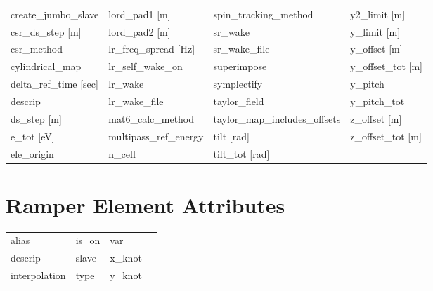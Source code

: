 \begin{tabular}{llll}
create_jumbo_slave               & lord_pad1 [m]                    & spin_tracking_method             & y2_limit [m]                     \\
csr_ds_step [m]                  & lord_pad2 [m]                    & sr_wake                          & y_limit [m]                      \\
csr_method                       & lr_freq_spread [Hz]              & sr_wake_file                     & y_offset [m]                     \\
cylindrical_map                  & lr_self_wake_on                  & superimpose                      & y_offset_tot [m]                 \\
delta_ref_time [sec]             & lr_wake                          & symplectify                      & y_pitch                          \\
descrip                          & lr_wake_file                     & taylor_field                     & y_pitch_tot                      \\
ds_step [m]                      & mat6_calc_method                 & taylor_map_includes_offsets      & z_offset [m]                     \\
e_tot [eV]                       & multipass_ref_energy             & tilt [rad]                       & z_offset_tot [m]                 \\
ele_origin                       & n_cell                           & tilt_tot [rad]                   &                                  \\
 \bottomrule
 \end{tabular}
 \vfill
 
 \section{Ramper Element Attributes}
 \label{s:list.ramper}
 
 \begin{tabular}{llll} \toprule
alias                            & is_on                            & var                              &                                  \\
descrip                          & slave                            & x_knot                           &                                  \\
interpolation                    & type                             & y_knot                           &                                  \\
 \bottomrule
 \end{tabular}
 \vfill
 
